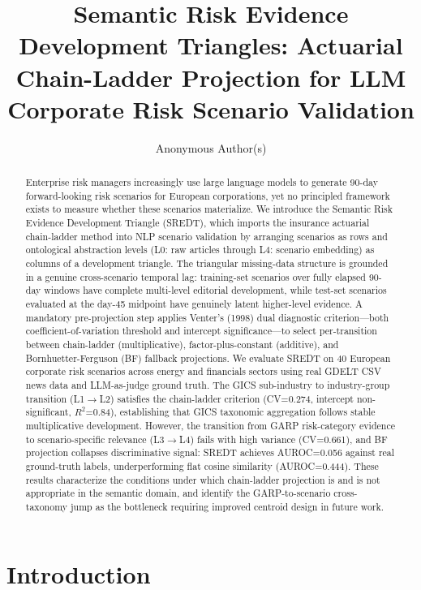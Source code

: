 \documentclass[11pt,letterpaper]{article}
\title{\textbf{Semantic Risk Evidence Development Triangles: Actuarial Chain-Ladder Projection for LLM Corporate Risk Scenario Validation}}
\author{%
  Anonymous Author(s)
}
\date{}
\begin{document}
\maketitle

\begin{abstract}
Enterprise risk managers increasingly use large language models to generate 90-day forward-looking risk scenarios for European corporations, yet no principled framework exists to measure whether these scenarios materialize. We introduce the Semantic Risk Evidence Development Triangle (SREDT), which imports the insurance actuarial chain-ladder method into NLP scenario validation by arranging scenarios as rows and ontological abstraction levels (L0: raw articles through L4: scenario embedding) as columns of a development triangle. The triangular missing-data structure is grounded in a genuine cross-scenario temporal lag: training-set scenarios over fully elapsed 90-day windows have complete multi-level editorial development, while test-set scenarios evaluated at the day-45 midpoint have genuinely latent higher-level evidence. A mandatory pre-projection step applies Venter's (1998) dual diagnostic criterion---both coefficient-of-variation threshold and intercept significance---to select per-transition between chain-ladder (multiplicative), factor-plus-constant (additive), and Bornhuetter-Ferguson (BF) fallback projections. We evaluate SREDT on 40 European corporate risk scenarios across energy and financials sectors using real GDELT CSV news data and LLM-as-judge ground truth. The GICS sub-industry to industry-group transition (L1$\to$L2) satisfies the chain-ladder criterion (CV=0.274, intercept non-significant, $R^2$=0.84), establishing that GICS taxonomic aggregation follows stable multiplicative development. However, the transition from GARP risk-category evidence to scenario-specific relevance (L3$\to$L4) fails with high variance (CV=0.661), and BF projection collapses discriminative signal: SREDT achieves AUROC=0.056 against real ground-truth labels, underperforming flat cosine similarity (AUROC=0.444). These results characterize the conditions under which chain-ladder projection is and is not appropriate in the semantic domain, and identify the GARP-to-scenario cross-taxonomy jump as the bottleneck requiring improved centroid design in future work.
\end{abstract}

\section{Introduction}
\end{document}
